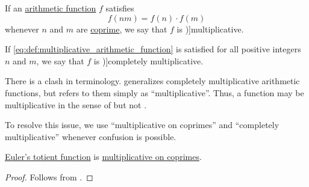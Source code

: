 \begin{definition}\label{def:multiplicative_arithmetic_function}
  If an \hyperref[def:arithmetic_function]{arithmetic function} \( f \) satisfies
  \begin{equation}\label{eq:def:multiplicative_arithmetic_function}
    f(nm) = f(n) \cdot f(m)
  \end{equation}
  whenever \( n \) and \( m \) are \hyperref[def:coprime_numbers]{coprime}, we say that \( f \) is \term[ru=мультипликативная (функция) (\cite[def. 36]{Бухштаб1966ТеорияЧисел})]{multiplicative}.

  If \eqref{eq:def:multiplicative_arithmetic_function} is satisfied for all positive integers \( n \) and \( m \), we say that \( f \) is \term[ru=вполне мультипликативная (функция) (\cite[def. 37]{Бухштаб1966ТеорияЧисел})]{completely multiplicative}.
\end{definition}
\begin{comments}
  \item There is a clash in terminology.  generalizes completely multiplicative arithmetic functions, but refers to them simply as \enquote{multiplicative}. Thus, a function may be multiplicative in the sense of  but not .

  To resolve this issue, we use \enquote{multiplicative on coprimes} and \enquote{completely multiplicative} whenever confusion is possible.
\end{comments}

\begin{proposition}\label{thm:totient_function_multiplicative}
  \hyperref[def:eulers_totient_function]{Euler's totient function} is \hyperref[def:multiplicative_arithmetic_function]{multiplicative on coprimes}.
\end{proposition}
\begin{proof}
  Follows from .
\end{proof}

